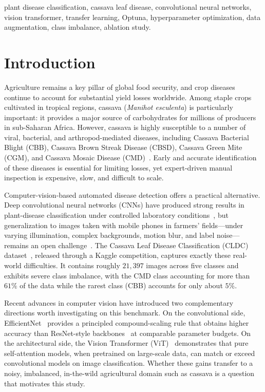 \documentclass[conference]{IEEEtran}
\begin{document}
\begin{IEEEkeywords}
plant disease classification, cassava leaf disease, convolutional neural networks, vision transformer, transfer learning, Optuna, hyperparameter optimization, data augmentation, class imbalance, ablation study.
\end{IEEEkeywords}

\section{Introduction}
\label{sec:intro}

Agriculture remains a key pillar of global food security, and crop diseases continue to account for substantial yield losses worldwide. Among staple crops cultivated in tropical regions, cassava (\emph{Manihot esculenta}) is particularly important: it provides a major source of carbohydrates for millions of producers in sub-Saharan Africa. However, cassava is highly susceptible to a number of viral, bacterial, and arthropod-mediated diseases, including Cassava Bacterial Blight (CBB), Cassava Brown Streak Disease (CBSD), Cassava Green Mite (CGM), and Cassava Mosaic Disease (CMD)~\cite{mwebaze2020cassava}. Early and accurate identification of these diseases is essential for limiting losses, yet expert-driven manual inspection is expensive, slow, and difficult to scale.

Computer-vision-based automated disease detection offers a practical alternative. Deep convolutional neural networks (CNNs) have produced strong results in plant-disease classification under controlled laboratory conditions~\cite{mohanty2016plantdisease,ferentinos2018}, but generalization to images taken with mobile phones in farmers' fields---under varying illumination, complex backgrounds, motion blur, and label noise---remains an open challenge~\cite{barbedo2018}. The Cassava Leaf Disease Classification (CLDC) dataset~\cite{mwebaze2020cassava}, released through a Kaggle competition, captures exactly these real-world difficulties. It contains roughly $21{,}397$ images across five classes and exhibits severe class imbalance, with the CMD class accounting for more than $61\%$ of the data while the rarest class (CBB) accounts for only about $5\%$.

Recent advances in computer vision have introduced two complementary directions worth investigating on this benchmark. On the convolutional side, EfficientNet~\cite{tan2019efficientnet} provides a principled compound-scaling rule that obtains higher accuracy than ResNet-style backbones~\cite{he2016resnet} at comparable parameter budgets. On the architectural side, the Vision Transformer (ViT)~\cite{dosovitskiy2021vit} demonstrates that pure self-attention models, when pretrained on large-scale data, can match or exceed convolutional models on image classification. Whether these gains transfer to a noisy, imbalanced, in-the-wild agricultural domain such as cassava is a question that motivates this study.
\end{document}
